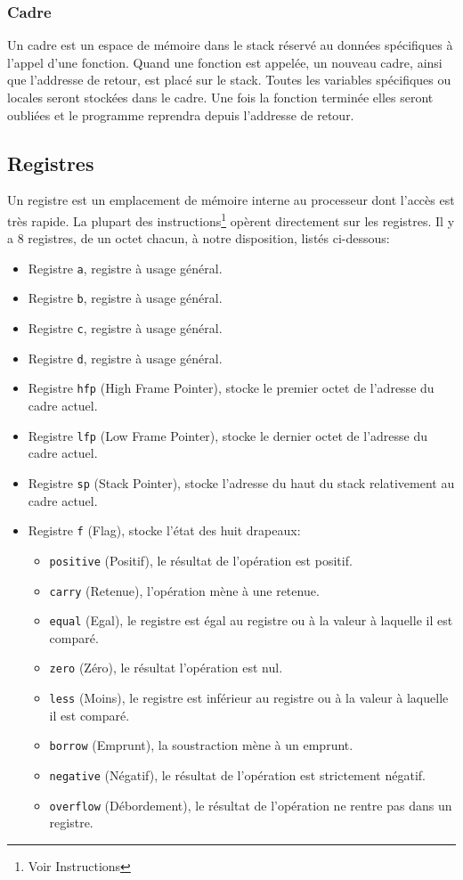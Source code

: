 \documentclass{article}
\begin{document}
\subsubsection{Cadre}
Un cadre est un espace de mémoire dans le stack réservé au données spécifiques à l'appel d'une fonction. Quand une fonction est appelée, un nouveau cadre, ainsi que l'addresse de retour, est placé sur le stack. Toutes les variables spécifiques ou locales seront stockées dans le cadre. Une fois la fonction terminée elles seront oubliées et le programme reprendra depuis l'addresse de retour.

\pagebreak

\subsection{Registres}
Un registre est un emplacement de mémoire interne au processeur dont l'accès est très rapide. La plupart des instructions\footnote{Voir Instructions} opèrent directement sur les registres. Il y a 8 registres, de un octet chacun, à notre disposition, listés ci-dessous:
\begin{itemize}
    \item Registre \texttt{a}, registre à usage général.
    \item Registre \texttt{b}, registre à usage général.
    \item Registre \texttt{c}, registre à usage général.
    \item Registre \texttt{d}, registre à usage général.
    \item Registre \texttt{hfp} (High Frame Pointer), stocke le premier octet de l'adresse du cadre actuel.
    \item Registre \texttt{lfp} (Low Frame Pointer), stocke le dernier octet de l'adresse du cadre actuel.
    \item Registre \texttt{sp} (Stack Pointer), stocke l'adresse du haut du stack relativement au cadre actuel.
    \item Registre \texttt{f} (Flag), stocke l'état des huit drapeaux:
    \begin{itemize}
        \item \texttt{positive} (Positif), le résultat de l'opération est positif.
        \item \texttt{carry} (Retenue), l'opération mène à une retenue.
        \item \texttt{equal} (Egal), le registre est égal au registre ou à la valeur à laquelle il est comparé.
        \item \texttt{zero} (Zéro), le résultat l'opération est nul.
        \item \texttt{less} (Moins), le registre est inférieur au registre ou à la valeur à laquelle il est comparé.
        \item \texttt{borrow} (Emprunt), la soustraction mène à un emprunt.
        \item \texttt{negative} (Négatif), le résultat de l'opération est strictement négatif.
        \item \texttt{overflow} (Débordement), le résultat de l'opération ne rentre pas dans un registre.
    \end{itemize}
\end{itemize}
\end{document}
